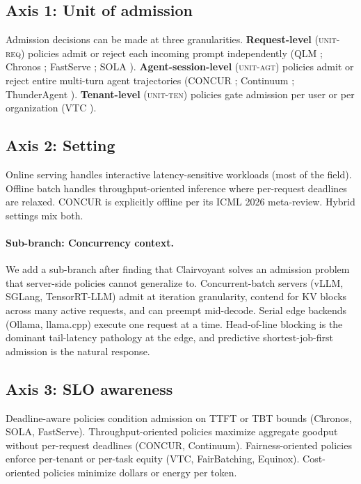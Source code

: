 \documentclass[10pt]{article} %
\theoremstyle{definition}
\begin{document}
\subsection{Axis 1: Unit of admission}

Admission decisions can be made at three granularities.
\textbf{Request-level} (\textsc{unit-req}) policies admit or reject
each incoming prompt independently (QLM \citep{patke2024qlm}; Chronos
\citep{marref2026chronos}; FastServe \citep{wu2026fastserve}; SOLA
\citep{hong2025sola}). \textbf{Agent-session-level} (\textsc{unit-agt})
policies admit or reject entire multi-turn agent trajectories (CONCUR
\citep{chen2026concur}; Continuum \citep{li2026continuum}; ThunderAgent
\citep{kang2026thunderagent}). \textbf{Tenant-level} (\textsc{unit-ten})
policies gate admission per user or per organization (VTC
\citep{sheng2024vtc}).

\subsection{Axis 2: Setting}

Online serving handles interactive latency-sensitive workloads (most
of the field). Offline batch handles throughput-oriented inference
where per-request deadlines are relaxed. CONCUR is explicitly offline
per its ICML 2026 meta-review. Hybrid settings mix both.

\paragraph{Sub-branch: Concurrency context.}
We add a sub-branch after finding that Clairvoyant
\citep{sundaresan2026clairvoyant} solves an admission problem that
server-side policies cannot generalize to. Concurrent-batch servers
(vLLM, SGLang, TensorRT-LLM) admit at iteration granularity, contend
for KV blocks across many active requests, and can preempt mid-decode.
Serial edge backends (Ollama, llama.cpp) execute one request at a
time. Head-of-line blocking is the dominant tail-latency pathology at
the edge, and predictive shortest-job-first admission is the natural
response.

\subsection{Axis 3: SLO awareness}

Deadline-aware policies condition admission on TTFT or TBT bounds
(Chronos, SOLA, FastServe). Throughput-oriented policies maximize
aggregate goodput without per-request deadlines (CONCUR, Continuum).
Fairness-oriented policies enforce per-tenant or per-task equity (VTC,
FairBatching, Equinox). Cost-oriented policies minimize dollars or
energy per token.
\end{document}
